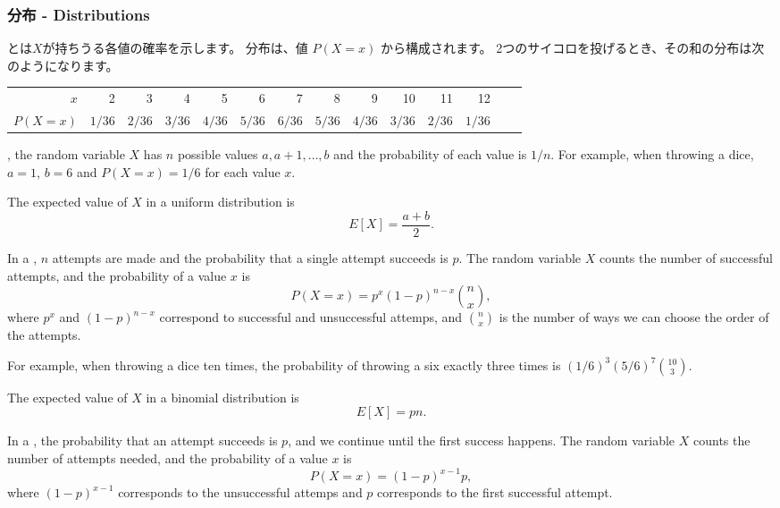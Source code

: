 \subsubsection{分布 - Distributions}


とは$X$が持ちうる各値の確率を示します。
分布は、値 $P(X=x)$ から構成されます。
2つのサイコロを投げるとき、その和の分布は次のようになります。

\begin{center}
\small {
\begin{tabular}{r|rrrrrrrrrrrrr}
$x$ & 2 & 3 & 4 & 5 & 6 & 7 & 8 & 9 & 10 & 11 & 12 \\
$P(X=x)$ & $1/36$ & $2/36$ & $3/36$ & $4/36$ & $5/36$ & $6/36$ & $5/36$ & $4/36$ & $3/36$ & $2/36$ & $1/36$ \\
\end{tabular}
}
\end{center}

,
the random variable $X$ has $n$ possible
values $a,a+1,\ldots,b$ and the probability of each value is $1/n$.
For example, when throwing a dice,
$a=1$, $b=6$ and $P(X=x)=1/6$ for each value $x$.

The expected value of $X$ in a uniform distribution is
\[E[X] = \frac{a+b}{2}.\]

In a , $n$ attempts
are made
and the probability that a single attempt succeeds
is $p$.
The random variable $X$ counts the number of
successful attempts,
and the probability of a value $x$ is
\[P(X=x)=p^x (1-p)^{n-x} {n \choose x},\]
where $p^x$ and $(1-p)^{n-x}$ correspond to
successful and unsuccessful attemps,
and ${n \choose x}$ is the number of ways
we can choose the order of the attempts.

For example, when throwing a dice ten times,
the probability of throwing a six exactly
three times is $(1/6)^3 (5/6)^7 {10 \choose 3}$.

The expected value of $X$ in a binomial distribution is
\[E[X] = pn.\]

In a ,
the probability that an attempt succeeds is $p$,
and we continue until the first success happens.
The random variable $X$ counts the number
of attempts needed, and the probability of
a value $x$ is
\[P(X=x)=(1-p)^{x-1} p,\]
where $(1-p)^{x-1}$ corresponds to the unsuccessful attemps
and $p$ corresponds to the first successful attempt.

